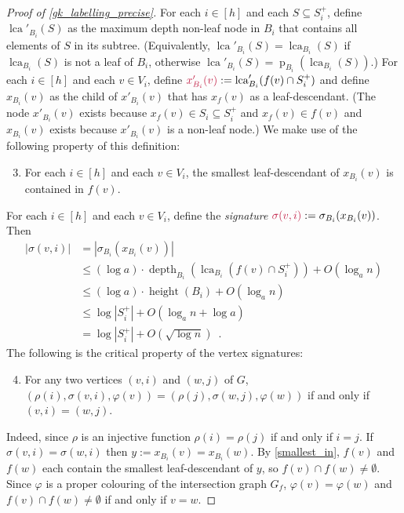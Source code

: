 \documentclass{patmorin}
\makeatletter
\renewcommand{\le}{\leqslant}
\newcommand{\defin}[1]{\emph{\textcolor{brightmaroon}{#1}}}
\def\mathcolor#1#{\@mathcolor{#1}}
\def\@mathcolor#1#2#3{%
  \protect\leavevmode
  \begingroup
    \color#1{#2}#3%
  \endgroup
}
\newcommand{\mathdefin}[1]{\mathcolor{brightmaroon}{#1}}
\DeclareMathOperator{\height}{height}
\DeclareMathOperator{\depth}{depth}
\DeclareMathOperator{\lca}{lca}
\DeclareMathOperator{\parent}{p}
\newcommand{\Oh}{O}
\makeatother
\begin{document}
\begin{proof}[Proof of \cref{gk_labelling_precise}]
  For each $i\in [h]$ and each $S\subseteq S^+_i$, define \defin{$\lca'_{B_i}(S)$} as the maximum depth non-leaf node in $B_i$ that contains all elements of $S$ in its subtree. (Equivalently, $\lca'_{B_i}(S)=\lca_{B_i}(S)$ if $\lca_{B_i}(S)$ is not a leaf of $B_i$, otherwise $\lca'_{B_i}(S)=\parent_{B_i}(\lca_{B_i}(S))$.) For each $i\in[h]$ and each $v\in V_i$, define $\mathdefin{x'_{B_i}(v)}:=\lca'_{B_i}(f(v)\cap S^+_i)$ and define \defin{$x_{B_i}(v)$} as the child of $x'_{B_i}(v)$ that has $x_f(v)$ as a leaf-descendant.   
  (The node $x'_{B_i}(v)$ exists because $x_f(v)\in S_i\subseteq S^+_i$ and $x_f(v)\in f(v)$ and $x_{B_i}(v)$ exists because $x'_{B_i}(v)$ is a non-leaf node.)  We make use of the following property of this definition:
  \begin{enumerate}[nosep,label=(Q\arabic*)]\setcounter{enumi}{2}
    \item\label{smallest_in} For each $i\in[h]$ and each $v\in V_i$, the smallest leaf-descendant of $x_{B_i}(v)$ is contained in $f(v)$.
  \end{enumerate}
  For each $i\in[h]$ and each $v\in V_i$, define the \defin{signature} $\mathdefin{\sigma(v,i)}:=\sigma_{B_i}(x_{B_i}(v))$.
  Then
  \begin{align*}
    |\sigma(v,i)| 
    & = |\sigma_{B_i}(x_{B_i}(v))| \\
    & \le  (\log a)\cdot \depth_{B_i}(\lca_{B_i}(f(v)\cap S^+_i)) + \Oh(\log_a n) \\
    & \le (\log a)\cdot\height(B_i) + \Oh(\log_a n) \\
    & \le \log |S^+_i| + \Oh(\log_a n + \log a) \\
    & = \log |S^+_i|+\Oh(\sqrt{\log n}) \enspace .
  \end{align*}
  The following is the critical property of the vertex signatures:
  \begin{enumerate}[nosep,label=(Q\arabic*)]\setcounter{enumi}{3}
   \item For any two vertices $(v,i)$ and $(w,j)$ of $G$, $(\rho(i),\sigma(v,i),\varphi(v))=(\rho(j),\sigma(w,j),\varphi(w))$ if and only if $(v,i)=(w,j)$.
  \end{enumerate}  
  Indeed, since $\rho$ is an injective function $\rho(i)=\rho(j)$ if and only if $i=j$.  If $\sigma(v,i)=\sigma(w,i)$ then $y:=x_{B_i}(v)=x_{B_i}(w)$. By \ref{smallest_in}, $f(v)$ and $f(w)$ each contain the smallest leaf-descendant of $y$, so $f(v)\cap f(w)\neq\emptyset$.   Since $\varphi$ is a proper colouring of the intersection graph $G_f$, $\varphi(v)=\varphi(w)$ and $f(v)\cap f(w)\neq\emptyset$ if and only if $v=w$.


\end{proof}
\end{document}
